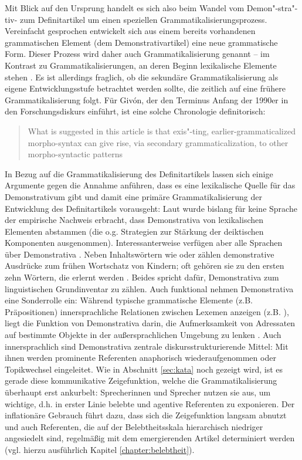 Mit Blick auf den Ursprung handelt es sich also beim Wandel vom Demon"-stra"-tiv- zum  Definitartikel um einen speziellen Grammatikalisierungsprozess. Vereinfacht gesprochen entwickelt sich aus einem bereits vorhandenen grammatischen Element (dem Demonstrativartikel) eine neue grammatische Form. Dieser Prozess wird daher auch  Grammatikalisierung \parencite{Givon1991, Detges2002, Szczepaniak2011a} genannt -- im Kontrast zu  Grammatikalisierungen, an deren Beginn lexikalische Elemente stehen \parencite[81]{Traugott2002}.
Es ist allerdings fraglich, ob die sekundäre Grammatikalisierung als eigene Entwicklungsstufe betrachtet werden sollte, die zeitlich auf eine frühere Grammatikalisierung folgt. Für Givón, der den Terminus Anfang der 1990er in den Forschungsdiskurs einführt, ist eine solche Chronologie definitorisch: \blockcquote[][193]{Givon1991}{What is suggested in this article is that exis"-ting, earlier-grammaticalized morpho-syntax can give rise, via secondary grammaticalization, to other morpho-syntactic patterns}.

In Bezug auf die Grammatikalisierung des Definitartikels lassen sich einige Argumente gegen die Annahme anführen, dass es eine lexikalische Quelle für das Demonstrativum gibt und damit eine primäre Grammatikalisierung der Entwicklung des Definitartikels vorausgeht: Laut \textcite[150]{Diessel1999} wurde bislang für keine Sprache der empirische Nachweis erbracht, dass Demonstrativa von lexikalischen Elementen abstammen (die o.g. Strategien zur Stärkung der deiktischen Komponenten ausgenommen). Interessanterweise verfügen aber alle Sprachen über Demonstrativa \parencite[1]{Diessel1999}. Neben Inhaltswörtern wie  oder  zählen demonstrative Ausdrücke zum frühen Wortschatz von Kindern; oft gehören sie zu den ersten zehn Wörtern, die erlernt werden \parencite[476]{Diessel2006}. Beides spricht dafür, Demonstrativa zum linguistischen Grundinventar zu zählen. Auch funktional nehmen Demonstrativa eine Sonderrolle ein: Während typische grammatische Elemente (z.B. Präpositionen) innersprachliche Relationen zwischen Lexemen anzeigen (z.B. ), liegt die Funktion von Demonstrativa darin, die Aufmerksamkeit von Adressaten auf bestimmte Objekte in der außersprachlichen Umgebung zu lenken \parencites{Diessel2006}. 
Auch innersprachlich sind Demonstrativa zentrale diskursstrukturierende Mittel: Mit ihnen werden prominente Referenten anaphorisch wiederaufgenommen oder Topikwechsel eingeleitet. Wie in Abschnitt \ref{sec:kata} noch gezeigt wird, ist es gerade diese kommunikative Zeigefunktion, welche die Grammatikalisierung überhaupt erst ankurbelt: Sprecherinnen und Sprecher nutzen sie aus, um wichtige, d.h. in erster Linie belebte und agentive Referenten zu exponieren. Der inflationäre Gebrauch führt dazu, dass sich die Zeigefunktion langsam abnutzt und auch Referenten, die auf der Belebtheitsskala hierarchisch niedriger angesiedelt sind, regelmäßig mit dem emergierenden Artikel determiniert werden (vgl. hierzu ausführlich Kapitel \ref{chapter:belebtheit}).


